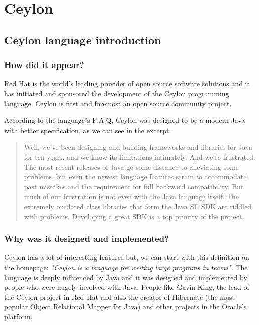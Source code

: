 \documentclass{abnt}
\begin{document}
\chapter{Ceylon}

\section{Ceylon language introduction}

\subsection{How did it appear?}

Red Hat\cite{1_1} is the world's leading provider of open source software
solutions and it has initiated and sponsored\cite{1_2} the development
of the Ceylon programming language. Ceylon is first and foremost an open source
community project.

According to the language's F.A.Q\cite{1_3}, Ceylon was designed to be a
modern Java with better specification, as we can see in the excerpt:

\begin{quote}
Well, we've been designing and building frameworks and libraries for Java for
ten years, and we know its limitations intimately. And we're frustrated. The
most recent releases of Java go some distance to alleviating some problems,
but even the newest language features strain to accommodate past mistakes and
the requirement for full backward compatibility.
But much of our frustration is not even with the Java language itself. The
extremely outdated class libraries that form the Java SE SDK are riddled with
problems. Developing a great SDK is a top priority of the project.
\end{quote}

\subsection{Why was it designed and implemented?}

Ceylon has a lot of interesting features but, we can start with this
definition on the homepage\cite{1_4}: \textit{"Ceylon is a language for writing
large programs in teams"}. The language is deeply influenced by Java and it was
designed and implemented by people who were hugely involved with Java. People
like Gavin King, the lead of the Ceylon project in Red Hat and also the creator
of Hibernate\cite{1_5} (the most popular Object Relational Mapper for Java) and
other projects in the Oracle's platform.
\end{document}
